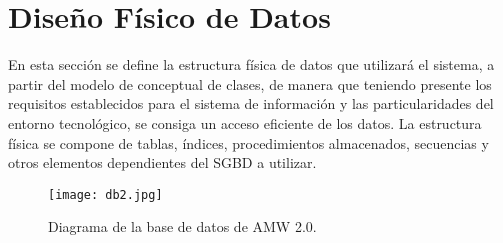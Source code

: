 \section{Diseño Físico de Datos}
En esta sección se define la estructura física de datos que utilizará el sistema, a partir del modelo de conceptual de clases, de manera que teniendo presente los requisitos establecidos para el sistema de información y las particularidades del entorno tecnológico, se consiga un acceso eficiente de los datos.
La estructura física se compone de tablas, índices, procedimientos almacenados, secuencias y otros elementos dependientes del SGBD a utilizar.

\begin{figure}[!h]
	\centering
	\texttt{[image: db2.jpg]}
	\caption{Diagrama de la base de datos de AMW 2.0.}
\end{figure}


